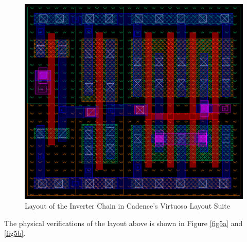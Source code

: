 \documentclass[letterpaper, 11pt]{article}
\begin{document}
\begin{figure}[htb!]
	\centering
	\includegraphics[width=0.7\linewidth]{inv_chain_3_layout.png}
	\caption{Layout of the Inverter Chain in Cadence's Virtuoso Layout Suite}
	\label{fig4}
\end{figure}

\pagebreak

The physical verifications of the layout above is shown in Figure \ref{fig5a} and \ref{fig5b}.
\end{document}
